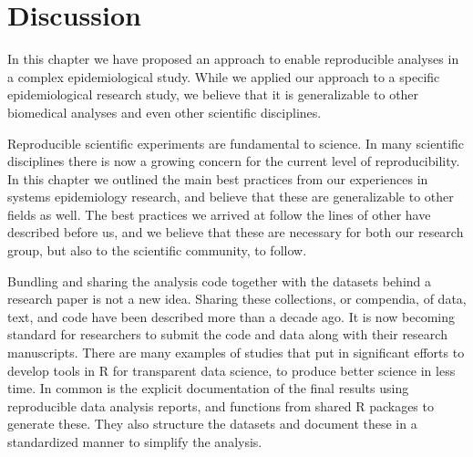\section{Discussion}
In this chapter we have proposed an approach to enable reproducible analyses in
a complex epidemiological study. While we applied our approach to a specific
epidemiological research study, we believe that it is generalizable to other
biomedical analyses and even other scientific disciplines. 

Reproducible scientific experiments are fundamental to science. In many
scientific disciplines there is now a growing concern for the current level of
reproducibility.\cite{editors2016reality} In this chapter we outlined the main
best practices from our experiences in systems epidemiology research, and
believe that these are generalizable to other fields as well. The best practices
we arrived at follow the lines of other have described before
us,\cite{sandve2013ten} and we believe that these are necessary for both our
research group, but also to the scientific community, to follow. 

Bundling and sharing the analysis code together with the datasets behind a
research paper is not a new idea. Sharing these collections, or compendia, of
data, text, and code have been described more than a decade
ago.\cite{gentleman2007statistical} It is now becoming standard for researchers
to submit the code and data along with their research manuscripts.  There are
many examples of studies that put in significant efforts to develop tools in R
for transparent data science, to produce better science in less
time.\cite{lowndes2017our,mcmurdie2013phyloseq,finak2018datapackager} In common
is the explicit documentation of the final results using reproducible data
analysis reports, and functions from shared R packages to generate these. They
also structure the datasets and document these in a standardized manner to
simplify the analysis. 

